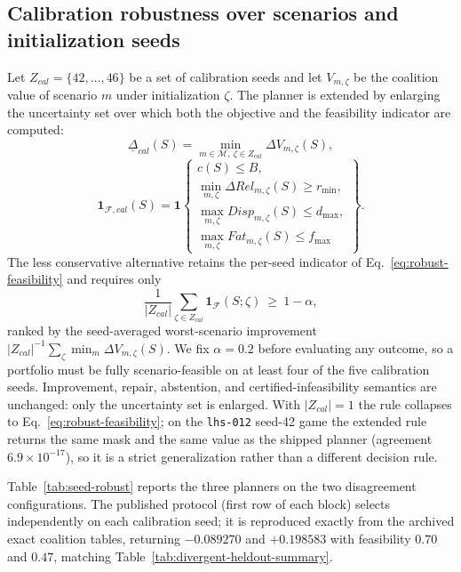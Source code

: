 \documentclass[review]{elsarticle}
\theoremstyle{plain}
\theoremstyle{definition}
\theoremstyle{remark}
\newcommand{\Models}{\mathcal{M}}
\newcommand{\Utility}{V}
\begin{document}
\subsection{Calibration robustness over scenarios and initialization seeds}\label{sec:seed-robust}

Let $Z_{cal}=\{42,\ldots,46\}$ be a set of calibration seeds and let $\Utility_{m,\zeta}$ be the coalition value of scenario $m$ under initialization $\zeta$. The planner is extended by enlarging the uncertainty set over which both the objective and the feasibility indicator are computed:
\begin{equation}
 \underline{\Delta}_{cal}(S)=\min_{m\in\Models,\ \zeta\in Z_{cal}}\Delta\Utility_{m,\zeta}(S),
 \label{eq:calibration-value}
\end{equation}
\begin{equation}
 \mathbf 1_{\mathcal F,cal}(S)=\mathbf 1\!\left\{\begin{array}{l}
  c(S)\le B,\\[2pt]
  \min_{m,\zeta}\Delta Rel_{m,\zeta}(S)\ge r_{\min},\\[2pt]
  \max_{m,\zeta}Disp_{m,\zeta}(S)\le d_{\max},\\[2pt]
  \max_{m,\zeta}Fat_{m,\zeta}(S)\le f_{\max}
 \end{array}\right\}.
 \label{eq:calibration-feasibility}
\end{equation}
The less conservative alternative retains the per-seed indicator of Eq.~\eqref{eq:robust-feasibility} and requires only
\begin{equation}
 \frac{1}{|Z_{cal}|}\sum_{\zeta\in Z_{cal}}\mathbf 1_{\mathcal F}(S;\zeta)\ \geq\ 1-\alpha ,
 \label{eq:chance-feasibility}
\end{equation}
ranked by the seed-averaged worst-scenario improvement $|Z_{cal}|^{-1}\sum_{\zeta}\min_{m}\Delta\Utility_{m,\zeta}(S)$. We fix $\alpha=0.2$ before evaluating any outcome, so a portfolio must be fully scenario-feasible on at least four of the five calibration seeds. Improvement, repair, abstention, and certified-infeasibility semantics are unchanged: only the uncertainty set is enlarged. With $|Z_{cal}|=1$ the rule collapses to Eq.~\eqref{eq:robust-feasibility}; on the \texttt{lhs-012} seed-42 game the extended rule returns the same mask and the same value as the shipped planner (agreement $6.9\times10^{-17}$), so it is a strict generalization rather than a different decision rule.

Table~\ref{tab:seed-robust} reports the three planners on the two disagreement configurations. The published protocol (first row of each block) selects independently on each calibration seed; it is reproduced exactly from the archived exact coalition tables, returning $-0.089270$ and $+0.198583$ with feasibility $0.70$ and $0.47$, matching Table~\ref{tab:divergent-heldout-summary}.
\end{document}
